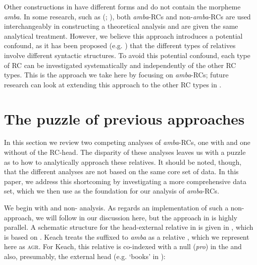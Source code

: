 \documentclass[output=paper,modfonts,nonflat,hidelinks]{langsci/langscibook}
\begin{document}

Other  constructions in  have different forms and do not contain the morpheme \textit{amba}. In some research, such as \citeauthor{Ngonyani2001} (\citeyear{Ngonyani2001}; \citeyear{Ngonyani2006}), both \textit{amba}{}-RCs and non-\textit{amba}{}-RCs are used interchangeably in constructing a theoretical analysis and are given the same analytical treatment. However, we believe this approach introduces a potential confound, as it has been proposed (e.g. \citealt{Barrett-Keach1985}) that the different types of  relatives involve different syntactic structures. To avoid this potential confound, each type of RC can be investigated systematically and independently of the other RC types. This is the approach we take here by focusing on \textit{amba}{}-RCs; future research can look at extending this approach to the other RC types in . 

\section{The puzzle of previous approaches}\label{sec:gould:3}
 
In this section we review two competing analyses of \textit{amba}{}-RCs, one with and one without  of the RC-head. The disparity of these analyses leaves us with a puzzle as to how to analytically approach these relatives. It should be noted, though, that the different analyses are not based on the same core set of data. In this paper, we address this shortcoming by investigating a more comprehensive data set, which we then use as the foundation for our analysis of \textit{amba}{}-RCs.

We begin with  and  non- analysis. As regards an implementation of such a non- approach, we will follow \citet{Keach2004} in our discussion here, but the approach in \citet{Barrett-Keach1985} is highly parallel. A schematic structure for the head-external relative in  is given in , which is based on \citet[126]{Keach2004}. Keach treats the  suffixed to \textit{amba} as a relative , which we represent here as \textsc{agr}. For Keach, this relative  is co-indexed with a null  (\textit{pro}) in the  and also, presumably, the external head (e.g. ‘books’ in ):
\end{document}
